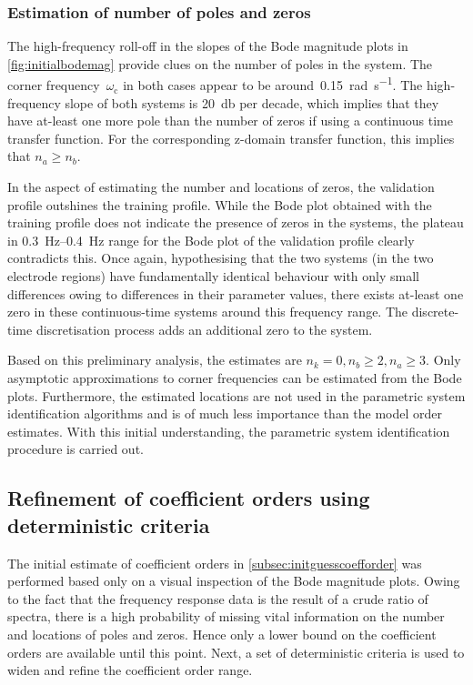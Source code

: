 \subsubsection*{Estimation of number of poles and zeros}

The  high-frequency  roll-off  in  the   slopes  of  the  Bode  magnitude  plots
in  \cref{fig:initialbodemag}  provide clues  on  the  number  of poles  in  the
system.  The  corner frequency~$\omega_\text{c}$  in  both  cases appear  to  be
around~\SI{0.15}{\radian\per\second}. The  high-frequency slope of  both systems
is \approx\SI{20}{\decibel}  per decade, which  implies that they  have at-least
one more  pole than  the number  of zeros  if using  a continuous  time transfer
function. For  the corresponding z-domain  transfer function, this  implies that
$n_a \ge n_b$.

In the  aspect of estimating the  number and locations of  zeros, the validation
profile outshines  the training profile. While  the Bode plot obtained  with the
training profile  does not indicate  the presence of  zeros in the  systems, the
plateau in \SIrange{0.3}{0.4}{\hertz} range for  the Bode plot of the validation
profile clearly contradicts this. Once again, hypothesising that the two systems
(in the two electrode regions)  have fundamentally identical behaviour with only
small differences owing  to differences in their parameter  values, there exists
at-least one zero in these  continuous-time systems around this frequency range.
The discrete-time discretisation process adds an additional zero to the system.

Based on this preliminary  analysis, the estimates are $n_k = 0,  n_b \ge 2, n_a
\ge 3$.  Only asymptotic approximations  to corner frequencies can  be estimated
from the  Bode plots. Furthermore, the  estimated locations are not  used in the
parametric system identification algorithms and  is of much less importance than
the  model order  estimates.  With this  initial  understanding, the  parametric
system identification procedure is carried out.

\subsection{Refinement of coefficient orders using deterministic criteria}\label{subsec:refinementofcoefforder}

The initial estimate  of coefficient orders in \cref{subsec:initguesscoefforder}
was performed  based only on  a visual inspection  of the Bode  magnitude plots.
Owing to  the fact that  the frequency  response data is  the result of  a crude
ratio of  spectra, there is a  high probability of missing  vital information on
the number and locations of poles and zeros. Hence only a lower bound on the
coefficient orders are available until this point. Next, a set of deterministic
criteria is used to widen and refine the coefficient order range.


